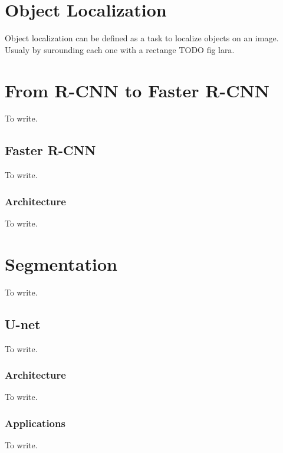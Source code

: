 \section{Object Localization}
Object localization can be defined as a task to localize objects on an image. Usualy
by surounding each one with a rectange TODO fig lara.

\section{From R-CNN to Faster R-CNN}
To write.


\subsection{Faster R-CNN}
To write.

\subsubsection{Architecture}
To write.




\section{Segmentation}
To write.

\subsection{U-net}
To write.

\subsubsection{Architecture}
To write.

\subsubsection{Applications}
To write.


